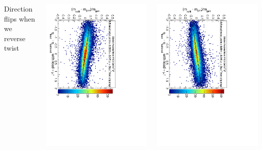 \documentclass[compress]{beamer}
\begin{document}
\begin{frame}
\begin{columns}
Direction flips when we reverse twist

\vspace{0.2 cm}
\includegraphics[height=0.95\linewidth, angle=90]{massbias_twist0_5mrad_1100_GlobalMuons2_plus.pdf}

\includegraphics[height=0.95\linewidth, angle=90]{massbias_antitwist0_5mrad_1100_GlobalMuons2_plus.pdf}
\end{columns}
\end{frame}
\end{document}
